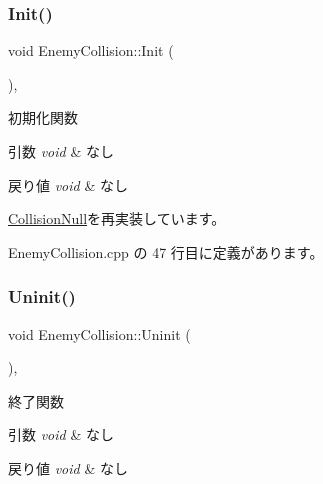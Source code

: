 \subsubsection{\texorpdfstring{Init()}{Init()}}
{\footnotesize\ttfamily void Enemy\+Collision\+::\+Init (\begin{DoxyParamCaption}{ }\end{DoxyParamCaption})\hspace{0.3cm}{\ttfamily [override]}, {\ttfamily [virtual]}}



初期化関数 


\begin{DoxyParams}{引数}
{\em void} & なし \\
\hline
\end{DoxyParams}

\begin{DoxyRetVals}{戻り値}
{\em void} & なし \\
\hline
\end{DoxyRetVals}


\mbox{\hyperlink{class_collision_null_a18cfc21fefcd3e8dec380ac44a85f111}{Collision\+Null}}を再実装しています。



 Enemy\+Collision.\+cpp の 47 行目に定義があります。

\mbox{\label{class_enemy_collision_a2a194c606fd162db803c70c6fed9b9e4}} 
\subsubsection{\texorpdfstring{Uninit()}{Uninit()}}
{\footnotesize\ttfamily void Enemy\+Collision\+::\+Uninit (\begin{DoxyParamCaption}{ }\end{DoxyParamCaption})\hspace{0.3cm}{\ttfamily [override]}, {\ttfamily [virtual]}}



終了関数 


\begin{DoxyParams}{引数}
{\em void} & なし \\
\hline
\end{DoxyParams}

\begin{DoxyRetVals}{戻り値}
{\em void} & なし \\
\hline
\end{DoxyRetVals}


